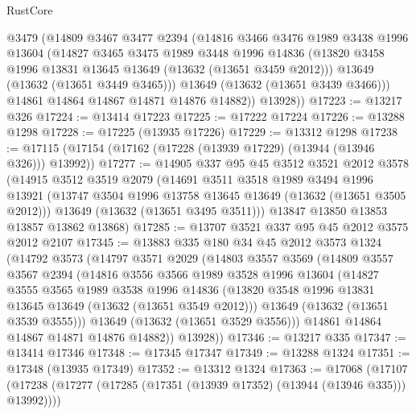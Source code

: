 \begin{lexlean}{RustCore}
\begin{coremodule}
          @3479
          (@14809
            @3467
            @3477
            @2394
            (@14816
              @3466
              @3476
              @1989
              @3438
              @1996
              @13604
              (@14827
                @3465
                @3475
                @1989
                @3448
                @1996
                @14836
                (@13820 @3458 @1996 @13831 @13645 @13649 (@13632 (@13651 @3459 @2012)))
                @13649
                (@13632 (@13651 @3449 @3465)))
              @13649
              (@13632 (@13651 @3439 @3466)))
            @14861
            @14864
            @14867
            @14871
            @14876
            @14882))
        @13928))
@17223 := @13217 @326
@17224 := @13414 @17223
@17225 := @17222 @17224
@17226 := @13288 @1298
@17228 := @17225 (@13935 @17226)
@17229 := @13312 @1298
@17238 := @17115 (@17154 (@17162 (@17228 (@13939 @17229) (@13944 (@13946 @326))) @13992))
@17277 := @14905
    @337
    @95
    @45
    @3512
    @3521
    @2012
    @3578
    (@14915
      @3512
      @3519
      @2079
      (@14691
        @3511
        @3518
        @1989
        @3494
        @1996
        @13921
        (@13747 @3504 @1996 @13758 @13645 @13649 (@13632 (@13651 @3505 @2012)))
        @13649
        (@13632 (@13651 @3495 @3511)))
      @13847
      @13850
      @13853
      @13857
      @13862
      @13868)
@17285 := @13707 @3521 @337 @95 @45 @2012 @3575 @2012 @2107
@17345 := @13883
    @335
    @180
    @34
    @45
    @2012
    @3573
    @1324
    (@14792
      @3573
      (@14797
        @3571
        @2029
        (@14803
          @3557
          @3569
          (@14809
            @3557
            @3567
            @2394
            (@14816
              @3556
              @3566
              @1989
              @3528
              @1996
              @13604
              (@14827
                @3555
                @3565
                @1989
                @3538
                @1996
                @14836
                (@13820 @3548 @1996 @13831 @13645 @13649 (@13632 (@13651 @3549 @2012)))
                @13649
                (@13632 (@13651 @3539 @3555)))
              @13649
              (@13632 (@13651 @3529 @3556)))
            @14861
            @14864
            @14867
            @14871
            @14876
            @14882))
        @13928))
@17346 := @13217 @335
@17347 := @13414 @17346
@17348 := @17345 @17347
@17349 := @13288 @1324
@17351 := @17348 (@13935 @17349)
@17352 := @13312 @1324
@17363 := @17068
    (@17107 (@17238 (@17277 (@17285 (@17351 (@13939 @17352) (@13944 (@13946 @335))) @13992))))

\end{coremodule}
\end{lexlean}
